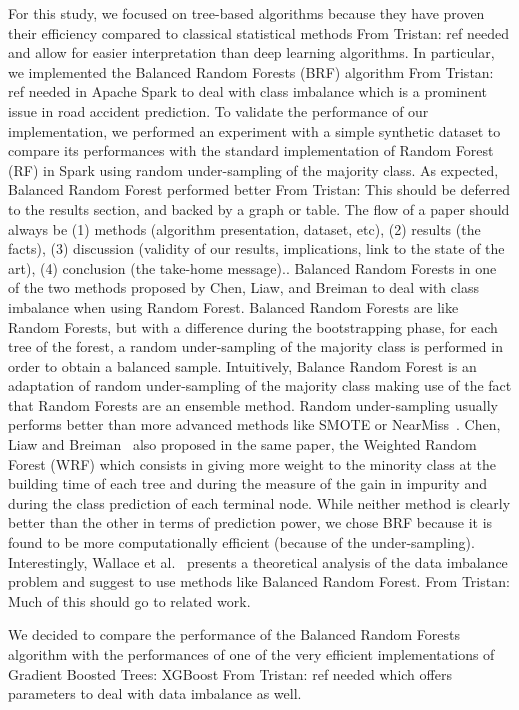 \documentclass[conference]{IEEEtran}
\newcommand{\TG}[1]{\colorlet{saved}{.}\color{orange}From Tristan: #1\color{saved}}
\begin{document}
For this study, we focused on tree-based algorithms because they
have proven their efficiency compared to classical statistical methods \TG{ref needed} and
allow for easier interpretation than deep learning algorithms. In
particular, we implemented the Balanced Random Forests (BRF) algorithm \TG{ref needed} in
Apache Spark to deal with class imbalance which is a prominent issue in
road accident prediction. To validate the performance of our implementation, we
performed an experiment with a simple synthetic dataset to compare its
performances with the standard implementation of Random Forest (RF) in
Spark using random under-sampling of the majority class. As expected,
Balanced Random Forest performed better \TG{This should be deferred to the results section, and backed by a graph or table.
The flow of a paper should always be (1) methods (algorithm presentation,
dataset, etc), (2) results (the facts), (3) discussion (validity of our
results, implications, link to the state of the art), (4) conclusion (the take-home message).}.
Balanced Random Forests in one of
the two methods proposed by Chen, Liaw, and Breiman\cite{Chen2004} to deal
with class imbalance when using Random Forest. Balanced Random Forests are
like Random Forests, but with a difference during the bootstrapping phase,
for each tree of the forest, a random under-sampling of the majority class
is performed in order to obtain a balanced sample. Intuitively, Balance
Random Forest is an adaptation of random under-sampling of the majority
class making use of the fact that Random Forests are an ensemble method.
Random under-sampling usually performs better than more advanced methods
like SMOTE or NearMiss~\cite{Branco2016}. Chen, Liaw and
Breiman~\cite{Chen2004} also proposed in the same paper, the Weighted Random
Forest (WRF) which consists in giving more weight to the minority class at
the building time of each tree and during the measure of the gain in
impurity and during the class prediction of each terminal node. While
neither method is clearly better than the other in terms of prediction
power, we chose BRF because it is found to be more computationally
efficient (because of the under-sampling). Interestingly, Wallace et
al.~\cite{Wallace2011} presents a theoretical analysis of the data
imbalance problem and suggest to use methods like Balanced Random Forest. \TG{Much of this should go to related work.}

We decided to compare the performance of the Balanced Random Forests
algorithm with the performances of one of the very efficient
implementations of Gradient Boosted Trees: XGBoost \TG{ref needed} which offers parameters
to deal with data imbalance as well.
\end{document}
